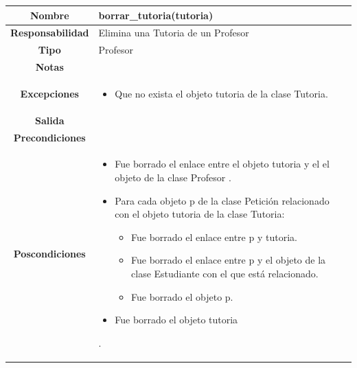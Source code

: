                        \begin{table}[!ht]
\begin{tabular}{|c|m{10cm}|}
\hline\rowcolor{Gray}
{\bf Nombre } & {borrar\_tutoria(tutoria)}\\
\hline
{\bf Responsabilidad } & {Elimina una Tutoria de un Profesor}\\
\hline
\rowcolor{Gray}
{\bf Tipo } & {Profesor} \\
\hline
{\bf Notas } & { } \\
\hline
\rowcolor{Gray}
{\bf Excepciones }& {
\begin{itemize}
\item Que no exista el objeto tutoria de la clase Tutoria.
\end{itemize}
} \\
\hline
{\bf Salida }& 
	  { 	
	  } 
 \\
\hline
\rowcolor{Gray}
{\bf Precondiciones }& {
}\\
\hline
{\bf Poscondiciones }& {

\begin{itemize}
\item Fue borrado el enlace entre el objeto tutoria y el el objeto de la clase Profesor .
\item Para cada objeto p de la clase Petición relacionado con el objeto tutoria de la clase Tutoria:
\begin{itemize}
\item Fue borrado el enlace entre p y tutoria.
\item Fue borrado el enlace entre p y el objeto de la clase Estudiante con el que está relacionado.
\item Fue borrado el objeto p.
\end{itemize}
\item Fue borrado el objeto tutoria
\end{itemize}

}.
  \\
\hline
\end{tabular}

\end{table}


